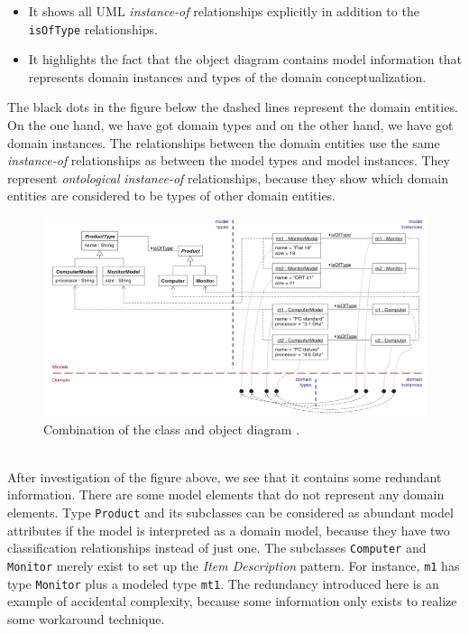 \begin{itemize}
\item{It shows all UML \textit{instance-of} relationships explicitly in addition to the \texttt{isOfType} relationships.}
\item{It highlights the fact that the object diagram contains model information that represents domain instances and types of the domain conceptualization.}
\end{itemize}
The black dots in the figure below the dashed lines represent the domain entities. On the one hand, we have got domain types and on the other hand, we have got domain instances. The relationships between the domain entities use the same \textit{instance-of} relationships as between the model types and model instances. They represent \textit{ontological} \textit{instance-of} relationships, because they show which domain entities are considered to be types of other domain entities.
\begin{figure}[h!]
\centering
\includegraphics[width=1.0\textwidth]{images/chap2_class_object_diagram.png}
\caption{Combination of the class and object diagram \cite{AccidentalComplexity}.}
\label{fig:class_object_diagram}
\end{figure} \\
After investigation of the figure above, we see that it contains some redundant information. There are some model elements that do not represent any domain elements. Type \texttt{Product} and its subclasses can be considered as abundant model attributes if the model is interpreted as a domain model, because they have two classification relationships instead of just one. The subclasses \texttt{Computer} and \texttt{Monitor} merely exist to set up the \textit{Item Description} pattern. For instance, \texttt{m1} has type \texttt{Monitor} plus a modeled type \texttt{mt1}. The redundancy introduced here is an example of accidental complexity, because some information only exists to realize some workaround technique.

